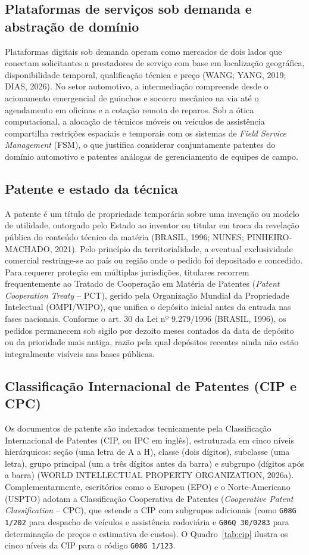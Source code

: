 \documentclass[12pt,a4paper]{article}
\begin{document}
\subsection{Plataformas de serviços sob demanda e abstração de domínio}
Plataformas digitais sob demanda operam como mercados de dois lados que conectam solicitantes a prestadores de serviço com base em localização geográfica, disponibilidade temporal, qualificação técnica e preço (WANG; YANG, 2019; DIAS, 2026). No setor automotivo, a intermediação compreende desde o acionamento emergencial de guinchos e socorro mecânico na via até o agendamento em oficinas e a cotação remota de reparos. Sob a ótica computacional, a alocação de técnicos móveis ou veículos de assistência compartilha restrições espaciais e temporais com os sistemas de \textit{Field Service Management} (FSM), o que justifica considerar conjuntamente patentes do domínio automotivo e patentes análogas de gerenciamento de equipes de campo.

\subsection{Patente e estado da técnica}
A patente é um título de propriedade temporária sobre uma invenção ou modelo de utilidade, outorgado pelo Estado ao inventor ou titular em troca da revelação pública do conteúdo técnico da matéria (BRASIL, 1996; NUNES; PINHEIRO-MACHADO, 2021). Pelo princípio da territorialidade, a eventual exclusividade comercial restringe-se ao país ou região onde o pedido foi depositado e concedido. Para requerer proteção em múltiplas jurisdições, titulares recorrem frequentemente ao Tratado de Cooperação em Matéria de Patentes (\textit{Patent Cooperation Treaty} -- PCT), gerido pela Organização Mundial da Propriedade Intelectual (OMPI/WIPO), que unifica o depósito inicial antes da entrada nas fases nacionais. Conforme o art. 30 da Lei nº 9.279/1996 (BRASIL, 1996), os pedidos permanecem sob sigilo por dezoito meses contados da data de depósito ou da prioridade mais antiga, razão pela qual depósitos recentes ainda não estão integralmente visíveis nas bases públicas.

\subsection{Classificação Internacional de Patentes (CIP e CPC)}
Os documentos de patente são indexados tecnicamente pela Classificação Internacional de Patentes (CIP, ou IPC em inglês), estruturada em cinco níveis hierárquicos: seção (uma letra de A a H), classe (dois dígitos), subclasse (uma letra), grupo principal (um a três dígitos antes da barra) e subgrupo (dígitos após a barra) (WORLD INTELLECTUAL PROPERTY ORGANIZATION, 2026a). Complementarmente, escritórios como o Europeu (EPO) e o Norte-Americano (USPTO) adotam a Classificação Cooperativa de Patentes (\textit{Cooperative Patent Classification} -- CPC), que estende a CIP com subgrupos adicionais (como \texttt{G08G 1/202} para despacho de veículos e assistência rodoviária e \texttt{G06Q 30/0283} para determinação de preços e estimativa de custos). O Quadro~\ref{tab:cip} ilustra os cinco níveis da CIP para o código \texttt{G08G 1/123}.
\end{document}
